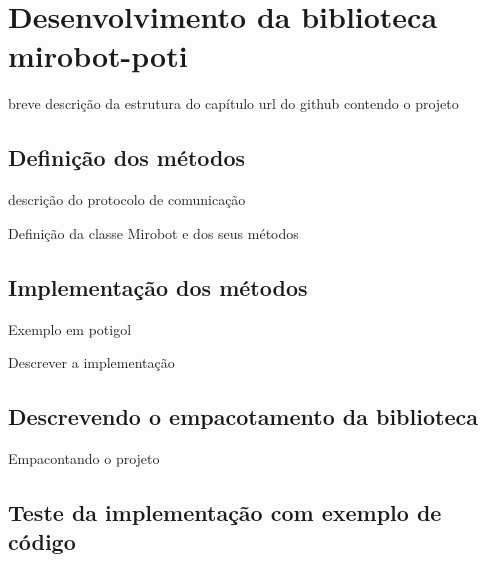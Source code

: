 \chapter{Desenvolvimento da biblioteca mirobot-poti}
\label{cap:mirobotpoti}

breve descrição da estrutura do capítulo
url do github contendo o projeto

\section{Definição dos métodos}

descrição do protocolo de comunicação

Definição da classe Mirobot e dos seus métodos

\section{Implementação dos métodos}

Exemplo em potigol

Descrever a implementação

\section{Descrevendo o empacotamento da biblioteca}

Empacontando o projeto

\section{Teste da implementação com exemplo de código}
